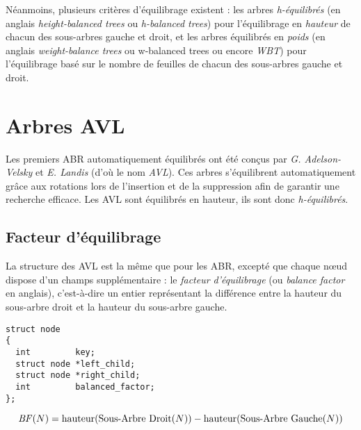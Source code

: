 \documentclass[11pt,a4paper,twoside]{article}
\begin{document}
Néanmoins, plusieurs critères d'équilibrage existent : les arbres \textit{h-équilibrés} (en anglais \textit{height-balanced trees} ou \textit{h-balanced trees}) pour l'équilibrage en \textit{hauteur} de chacun des sous-arbres gauche et droit, et les arbres équilibrés en \textit{poids} (en anglais \textit{weight-balance trees} ou {w-balanced trees} ou encore \textit{WBT}) pour l'équilibrage basé sur le nombre de feuilles de chacun des sous-arbres gauche et droit.


\clearpage


\section{Arbres AVL}

Les premiers ABR automatiquement équilibrés ont été conçus par \textit{G. Adelson-Velsky} et \textit{E. Landis} (d'où le nom \textit{AVL}).
Ces arbres s'équilibrent automatiquement grâce aux rotations lors de l'insertion et de la suppression afin de garantir une recherche efficace.
Les AVL sont équilibrés en hauteur, ils sont donc \textit{h-équilibrés}.


\subsection{Facteur d'équilibrage}

La structure des AVL est la même que pour les ABR, excepté que chaque nœud dispose d'un champs supplémentaire : le \textit{facteur d'équilibrage} (ou \textit{balance factor} en anglais), c'est-à-dire un entier représentant la différence entre la hauteur du sous-arbre droit et la hauteur du sous-arbre gauche.

\bigskip

\lstset{language=C}
\begin{lstlisting}[frame=single]
struct node
{
  int         key;
  struct node *left_child;
  struct node *right_child;
  int         balanced_factor;
};
\end{lstlisting}

\vspace*{-0.5cm}

\begin{equation*}
\text{\textit{BF}}(N) = \text{hauteur}(\text{Sous-Arbre Droit}(N)) - \text{hauteur}(\text{Sous-Arbre Gauche}(N))
\end{equation*}
\end{document}
